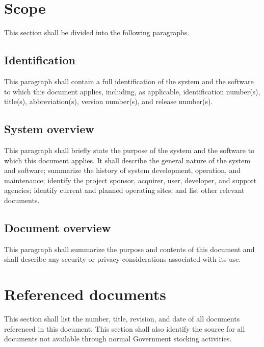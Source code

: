 \section{Scope}

This section shall be divided into the following paragraphs.

\subsection{Identification}

This paragraph shall contain a full identification of the system and the
software to which this document applies, including, as applicable,
identification number(s), title(s), abbreviation(s), version number(s),
and release number(s).

\subsection{System overview}

This paragraph shall briefly state the purpose of the system and the
software to which this document applies. It shall describe the general
nature of the system and software; summarize the history of system
development, operation, and maintenance; identify the project sponsor,
acquirer, user, developer, and support agencies; identify current and
planned operating sites; and list other relevant documents.

\subsection{Document overview}

This paragraph shall summarize the purpose and contents of this document
and shall describe any security or privacy considerations associated
with its use.

\section{}

\section{Referenced documents}

This section shall list the number, title, revision, and date of all
documents referenced in this document. This section shall also identify
the source for all documents not available through normal Government
stocking activities.

